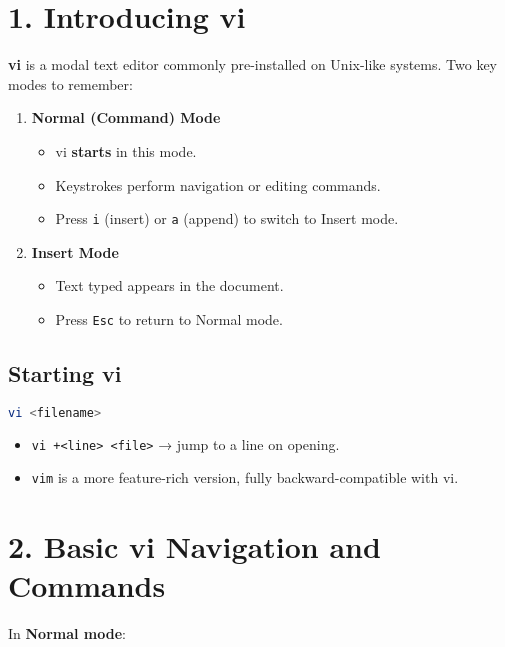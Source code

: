 \documentclass[a4paper]{report}
\begin{document}
\section*{1. Introducing vi}

\textbf{vi} is a modal text editor commonly pre-installed on Unix-like systems. Two key modes to remember:

\begin{enumerate}
    \item \textbf{Normal (Command) Mode}
    \begin{itemize}
        \item vi \textbf{starts} in this mode.
        \item Keystrokes perform navigation or editing commands.
        \item Press \texttt{i} (insert) or \texttt{a} (append) to switch to Insert mode.
    \end{itemize}

    \item \textbf{Insert Mode}
    \begin{itemize}
        \item Text typed appears in the document.
        \item Press \texttt{Esc} to return to Normal mode.
    \end{itemize}
\end{enumerate}

\subsection*{Starting vi}
\begin{lstlisting}[language=bash]
vi <filename>
\end{lstlisting}
\begin{itemize}
    \item \texttt{vi +<line> <file>} → jump to a line on opening.
    \item \texttt{vim} is a more feature-rich version, fully backward-compatible with vi.
\end{itemize}

\section*{2. Basic vi Navigation and Commands}

In \textbf{Normal mode}:
\end{document}
